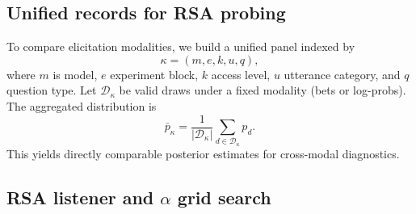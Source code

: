 \documentclass[11pt]{article}
\begin{document}
\subsection{Unified records for RSA probing}

To compare elicitation modalities, we build a unified panel indexed by
\[
\kappa=(m,e,k,u,q),
\]
where $m$ is model, $e$ experiment block, $k$ access level, $u$ utterance category, and $q$ question type. Let $\mathcal{D}_\kappa$ be valid draws under a fixed modality (bets or log-probs). The aggregated distribution is
\[
\bar p_\kappa=\frac{1}{|\mathcal{D}_\kappa|}\sum_{d\in\mathcal{D}_\kappa}p_d.
\]
This yields directly comparable posterior estimates for cross-modal diagnostics.



\subsection{RSA listener and $\alpha$ grid search}
\end{document}

